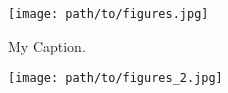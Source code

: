 \begin{figure}[h]
    \center
    \texttt{[image: path/to/figures.jpg]}
    \caption{My Caption.}
    \label{fig:label}
\end{figure}

\begin{figure}[h]
    \texttt{[image: path/to/figures\_2.jpg]}
\end{figure}